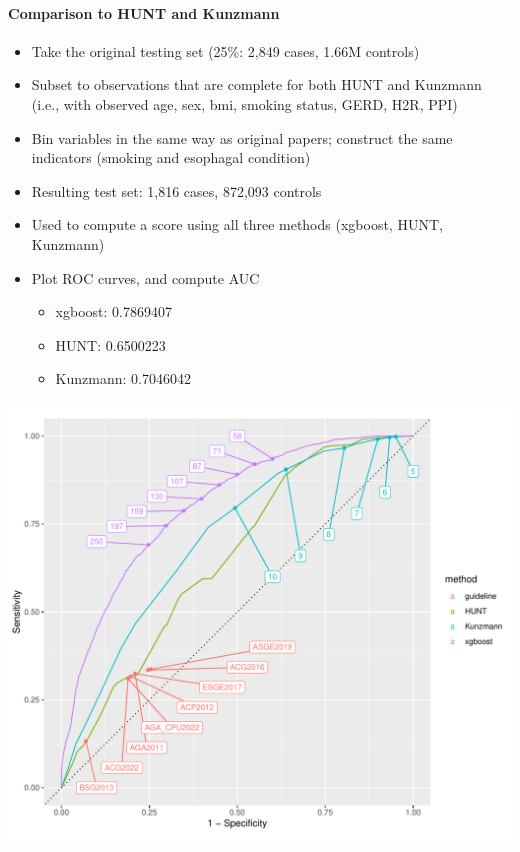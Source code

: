 \documentclass[12pt]{article}
\begin{document}
\paragraph*{Comparison to HUNT and Kunzmann}
\begin{itemize}
	\item Take the original testing set (25\%: 2,849 cases, 1.66M controls)
	\item Subset to observations that are complete for both HUNT and Kunzmann 
	(i.e., with observed age, sex, bmi, smoking status, GERD, H2R, PPI)
	\item Bin variables in the same way as original papers; construct the same indicators (smoking and esophagal condition)
	\item Resulting test set: 1,816 cases, 872,093 controls
	\item Used to compute a score using all three methods (xgboost, HUNT, Kunzmann)
	\item Plot ROC curves, and compute AUC
	\begin{itemize}
		\item xgboost: 0.7869407
		\item HUNT: 0.6500223
		\item Kunzmann: 0.7046042
	\end{itemize}
\end{itemize}
\begin{center}
\includegraphics[width=\textwidth]{xgb_kunzmann_hunt_roc.pdf}
\end{center}
\end{document}
